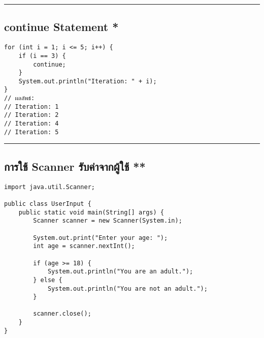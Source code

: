 \documentclass[11pt]{article}
\begin{document}
\noindent\rule{\textwidth}{0.5pt}
\subsection{continue Statement *}
\label{sec:org8563585}
\begin{verbatim}
for (int i = 1; i <= 5; i++) {
    if (i == 3) {
        continue;
    }
    System.out.println("Iteration: " + i);
}
// ผลลัพธ์:
// Iteration: 1
// Iteration: 2
// Iteration: 4
// Iteration: 5
\end{verbatim}

\noindent\rule{\textwidth}{0.5pt}
\subsection{การใช้ Scanner รับค่าจากผู้ใช้ **}
\label{sec:orge5f022b}
\begin{verbatim}
import java.util.Scanner;

public class UserInput {
    public static void main(String[] args) {
        Scanner scanner = new Scanner(System.in);

        System.out.print("Enter your age: ");
        int age = scanner.nextInt();

        if (age >= 18) {
            System.out.println("You are an adult.");
        } else {
            System.out.println("You are not an adult.");
        }

        scanner.close();
    }
}
\end{verbatim}
\end{document}
